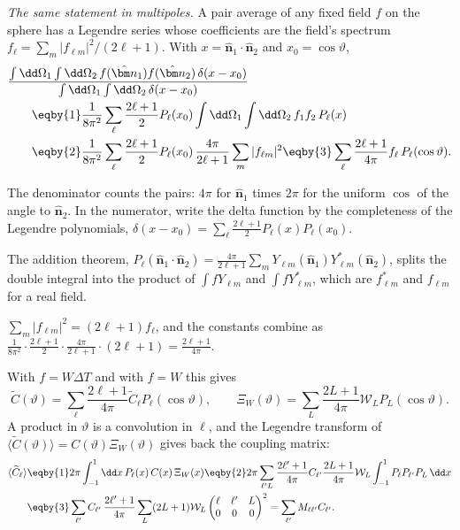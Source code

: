\emph{The same statement in multipoles.} A pair average of any fixed field $f$ on the sphere has a
Legendre series whose coefficients are the field's spectrum $f_\ell=\sum_m|f_{\ell m}|^2/(2\ell+1)$. With
$x=\hat{\bm n}_1\cdot\hat{\bm n}_2$ and $x_0=\cos\vartheta$,
\begin{align*}
  &\frac{\int\dd\Omega_1\int\dd\Omega_2\,f(\hat{\bm n}_1)f(\hat{\bm n}_2)\,\delta(x-x_0)}{\int\dd\Omega_1\int\dd\Omega_2\,\delta(x-x_0)}\\
  &\qquad\eqby{1}\frac1{8\pi^2}\sum_\ell\frac{2\ell+1}2P_\ell(x_0)\int\dd\Omega_1\int\dd\Omega_2\,f_1f_2\,P_\ell(x)\\
  &\qquad\eqby{2}\frac1{8\pi^2}\sum_\ell\frac{2\ell+1}2P_\ell(x_0)\,\frac{4\pi}{2\ell+1}\sum_m|f_{\ell m}|^2
   \eqby{3}\sum_\ell\frac{2\ell+1}{4\pi}f_\ell\,P_\ell(\cos\vartheta) .
\end{align*}
\begin{explain}
  \item The denominator counts the pairs: $4\pi$ for $\hat{\bm n}_1$ times $2\pi$ for the uniform $\cos$ of the angle
        to $\hat{\bm n}_2$. In the numerator, write the delta function by the completeness of the Legendre polynomials,
        $\delta(x-x_0)=\sum_\ell\frac{2\ell+1}2P_\ell(x)P_\ell(x_0)$.
  \item The addition theorem, $P_\ell(\hat{\bm n}_1\cdot\hat{\bm n}_2)=\frac{4\pi}{2\ell+1}\sum_mY_{\ell m}(\hat{\bm n}_1)Y^*_{\ell m}(\hat{\bm n}_2)$,
        splits the double integral into the product of $\int fY_{\ell m}$ and $\int fY^*_{\ell m}$, which are
        $f^*_{\ell m}$ and $f_{\ell m}$ for a real field.
  \item $\sum_m|f_{\ell m}|^2=(2\ell+1)f_\ell$, and the constants combine as
        $\frac1{8\pi^2}\cdot\frac{2\ell+1}2\cdot\frac{4\pi}{2\ell+1}\cdot(2\ell+1)=\frac{2\ell+1}{4\pi}$.
\end{explain}
With $f=W\Delta T$ and with $f=W$ this gives
\[
  \widetilde C(\vartheta)=\sum_\ell\frac{2\ell+1}{4\pi}\widetilde C_\ell P_\ell(\cos\vartheta),\qquad
  \Xi_W(\vartheta)=\sum_L\frac{2L+1}{4\pi}\mathcal W_LP_L(\cos\vartheta).
\] A product in $\vartheta$ is a convolution in
$\ell$, and the Legendre transform of $\langle\widetilde C(\vartheta)\rangle=C(\vartheta)\Xi_W(\vartheta)$ gives back the coupling
matrix:
\begin{align}
  \langle\widetilde C_\ell\rangle
  &\eqby{1}2\pi\int_{-1}^1\dd x\,P_\ell(x)\,C(x)\,\Xi_W(x)
   \eqby{2}2\pi\sum_{\ell'L}\frac{2\ell'+1}{4\pi}C_{\ell'}\frac{2L+1}{4\pi}\mathcal W_L\int_{-1}^1P_\ell P_{\ell'}P_L\,\dd x
   \nonumber\\
  &\eqby{3}\sum_{\ell'}C_{\ell'}\,\frac{2\ell'+1}{4\pi}\sum_L(2L+1)\mathcal W_L
   \begin{pmatrix}\ell&\ell'&L\\0&0&0\end{pmatrix}^2
   =\sum_{\ell'}M_{\ell\ell'}C_{\ell'} .
  \label{8b:eq:M-real}
\end{align}
